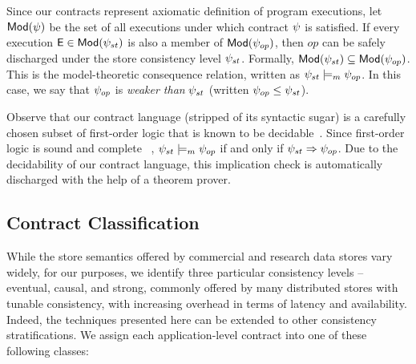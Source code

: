 Since our contracts represent axiomatic definition of program
executions, let ${\normalfont \textsf{Mod}}(\psi)$ be the set of all executions under which
contract $\psi$ is satisfied. If every execution ${\normalfont \textsf{E}} \in
{\normalfont \textsf{Mod}}(\psi_{st})$ is also a member of ${\normalfont \textsf{Mod}}(\psi_{op})$, then $op$ can be
safely discharged under the store consistency level $\psi_{st}$.
Formally, ${\normalfont \textsf{Mod}}(\psi_{st}) \subseteq {\normalfont \textsf{Mod}}(\psi_{op})$. This is the
model-theoretic consequence relation, written as $\psi_{st} \models_m
\psi_{op}$. In this case, we say that $\psi_{op}$ is \emph{weaker than}
$\psi_{st}$ (written $\psi_{op} \le \psi_{st}$). 

Observe that our contract language (stripped of its syntactic sugar) is a
carefully chosen subset of first-order logic that is known to be
decidable~\cite{epr}.  Since first-order logic is sound and complete
~\cite{completeness}, $\psi_{st} \models_m \psi_{op}$ if and only if
$\psi_{st} \Rightarrow \psi_{op}$.  Due to the decidability of our
contract language, this implication check is automatically discharged
with the help of a theorem prover. 


\subsection{Contract Classification}

While the store semantics offered by commercial and research data stores
vary widely, for our purposes, we identify three particular consistency
levels -- eventual, causal, and strong, commonly offered by many distributed
stores with tunable consistency, with increasing overhead in terms of
latency and availability. Indeed, the techniques presented here can be
extended to other consistency stratifications. We assign each
application-level contract into one of these following classes:


